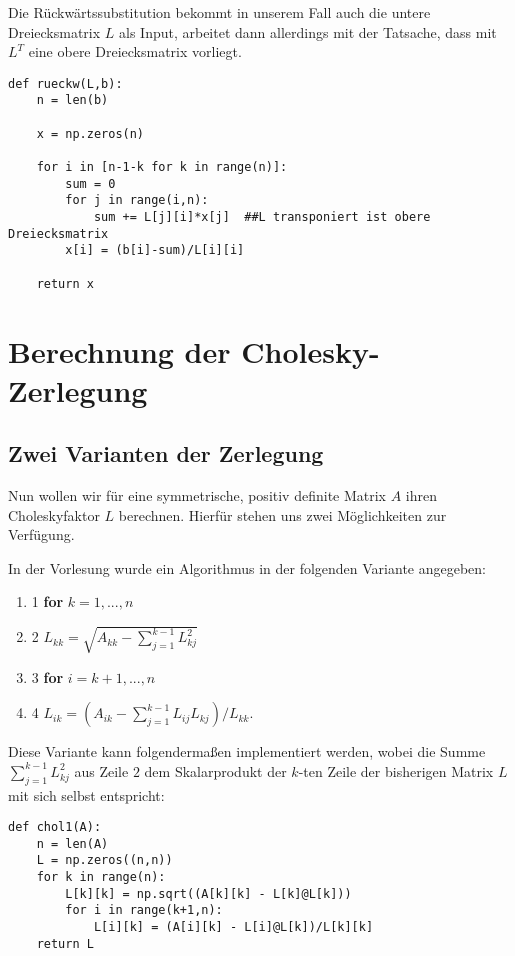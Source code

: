 \documentclass{article}
\begin{document}
Die Rückwärtssubstitution bekommt in unserem Fall auch die untere Dreiecksmatrix $L$ als Input, arbeitet dann allerdings mit der Tatsache, dass mit $L^{T}$ eine obere Dreiecksmatrix vorliegt.

\lstset{language=Python}
\lstset{frame=lines}
\lstset{basicstyle=\footnotesize}
\begin{lstlisting}
def rueckw(L,b):
    n = len(b)

    x = np.zeros(n)

    for i in [n-1-k for k in range(n)]:
        sum = 0
        for j in range(i,n):
            sum += L[j][i]*x[j]  ##L transponiert ist obere Dreiecksmatrix
        x[i] = (b[i]-sum)/L[i][i]

    return x
\end{lstlisting}

\section{Berechnung der Cholesky-Zerlegung}
\subsection{Zwei Varianten der Zerlegung}

Nun wollen wir für eine symmetrische, positiv definite Matrix $A$ ihren Choleskyfaktor $L$ berechnen. Hierfür stehen uns zwei Möglichkeiten zur Verfügung.

In der Vorlesung wurde ein Algorithmus in der folgenden Variante angegeben:
\begin{enumerate}
\itemsep0em
\item[] 1 \textbf{for} $k = 1,...,n$
\item[] 2 \qquad $L_{kk} = \sqrt{A_{kk} - \sum_{j=1}^{k-1} L_{kj}^2}$
\item[] 3 \qquad \textbf{for} $i = k+1,...,n$
\item[] 4 \qquad \qquad $L_{ik} = (A_{ik} - \sum_{j=1}^{k-1} L_{ij} L_{kj})/L_{kk}$.

\end{enumerate}


Diese Variante kann folgendermaßen implementiert werden, wobei die Summe $\sum_{j=1}^{k-1}L_{kj}^{2}$ aus Zeile $2$ dem Skalarprodukt der $k$-ten Zeile der bisherigen Matrix $L$ mit sich selbst entspricht:

\lstset{language=Python}
\lstset{frame=lines}
\lstset{basicstyle=\footnotesize}
\begin{lstlisting}
def chol1(A):
    n = len(A)
    L = np.zeros((n,n))
    for k in range(n):
        L[k][k] = np.sqrt((A[k][k] - L[k]@L[k]))
        for i in range(k+1,n):
            L[i][k] = (A[i][k] - L[i]@L[k])/L[k][k]
    return L
\end{lstlisting}
\end{document}
